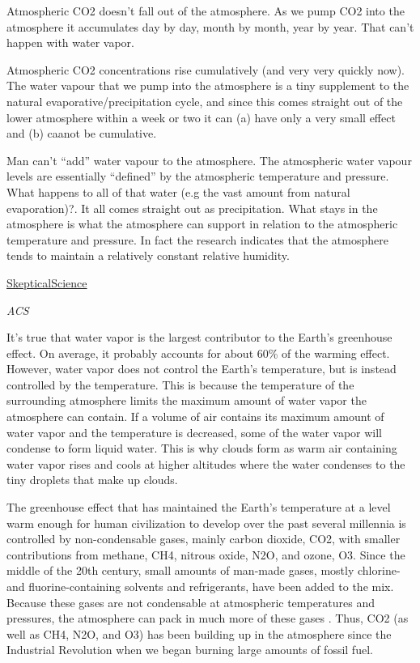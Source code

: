 \documentclass[
]{book}
\begin{document}
Atmospheric CO2 doesn't fall out of the atmosphere. As we pump CO2 into the atmosphere it accumulates day by day, month by month, year by year. That can't happen with water vapor.

Atmospheric CO2 concentrations rise cumulatively (and very very quickly now).
The water vapour that we pump into the atmosphere is a tiny supplement to the natural evaporative/precipitation cycle, and since this comes straight out of the lower atmosphere within a week or two it can (a) have only a very small effect and (b) caanot be cumulative.

Man can't ``add'' water vapour to the atmosphere. The atmospheric water vapour levels are essentially ``defined'' by the atmospheric temperature and pressure.
What happens to all of that water (e.g the vast amount from natural evaporation)?. It all comes straight out as precipitation. What stays in the atmosphere is what the atmosphere can support in relation to the atmospheric temperature and pressure. In fact the research indicates that the atmosphere tends to maintain a relatively constant relative humidity.

\href{https://skepticalscience.com/water-vapor-greenhouse-gas.htm}{SkepticalScience}

\emph{ACS}

It's true that water vapor is the largest contributor to the Earth's greenhouse effect. On average, it probably accounts for about 60\% of the warming effect. However, water vapor does not control the Earth's temperature, but is instead controlled by the temperature. This is because the temperature of the surrounding atmosphere limits the maximum amount of water vapor the atmosphere can contain. If a volume of air contains its maximum amount of water vapor and the temperature is decreased, some of the water vapor will condense to form liquid water. This is why clouds form as warm air containing water vapor rises and cools at higher altitudes where the water condenses to the tiny droplets that make up clouds.

The greenhouse effect that has maintained the Earth's temperature at a level warm enough for human civilization to develop over the past several millennia is controlled by non-condensable gases, mainly carbon dioxide, CO2, with smaller contributions from methane, CH4, nitrous oxide, N2O, and ozone, O3. Since the middle of the 20th century, small amounts of man-made gases, mostly chlorine- and fluorine-containing solvents and refrigerants, have been added to the mix. Because these gases are not condensable at atmospheric temperatures and pressures, the atmosphere can pack in much more of these gases . Thus, CO2 (as well as CH4, N2O, and O3) has been building up in the atmosphere since the Industrial Revolution when we began burning large amounts of fossil fuel.
\end{document}
